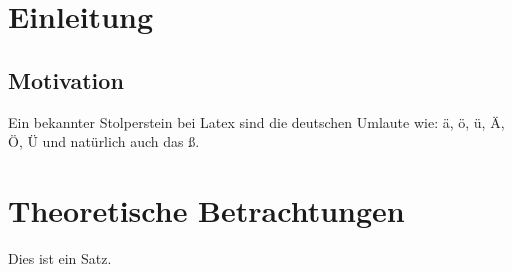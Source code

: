 \documentclass[a4paper, 11pt]{article}
\begin{document}
\tableofcontents

\newpage

\section{Einleitung}

\subsection{Motivation}

Ein bekannter Stolperstein bei Latex sind die deutschen Umlaute wie: ä, ö, ü,
Ä, Ö, Ü und natürlich auch das ß.

\newpage

\section{Theoretische Betrachtungen}

Dies ist ein Satz.

\end{document}
